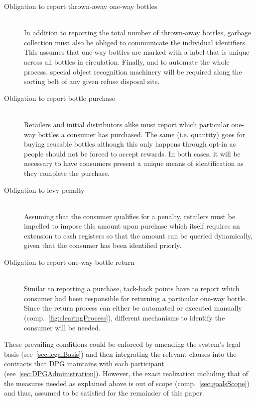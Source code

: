 \begin{description}
	\item[Obligation to report thrown-away one-way bottles]
	\hfill \\
	In addition to reporting the total number of thrown-away bottles\hide{(\ref{itm:reportNumber})}, garbage collection must also be obliged to communicate the individual identifiers\hide{(\ref{itm:reportIdentifier})}. This assumes that one-way bottles are marked with a label that is unique across all bottles in circulation. Finally, and to automate the whole process, special object recognition machinery will be required along the sorting belt of any given refuse disposal site.
	\item[Obligation to report bottle purchase]
	\hfill \\
	Retailers and initial distributors alike must report which particular one-way bottles a consumer has purchased\hide{(\ref{itm:reportOneWays})}. The same (i.e. quantity) goes for buying reusable bottles \hide{(\ref{itm:reportReusableNumber})} although this only happens through opt-in as people should not be forced to accept rewards. In both cases, it will be necessary to have consumers present a unique means of identification as they complete the purchase.
	\item[Obligation to levy penalty]
	\hfill \\
	Assuming that the consumer qualifies for a penalty, retailers must be impelled to impose this amount upon purchase which itself requires an extension to cash registers so that the amount can be queried dynamically\hide{(\ref{itm:lookUpPenalty})}, given that the consumer has been identified priorly.
	\item[Obligation to report one-way bottle return]
	\hfill \\
	Similar to reporting a purchase, tack-back points have to report which consumer had been responsible for returning a particular one-way bottle\hide{(\ref{itm:reportOneWayReturn})}. Since the return process can either be automated or executed manually (comp.~\autoref{fig:clearingProcess}), different mechanisms to identify the consumer will be needed.  
\end{description}

These prevailing conditions could be enforced by amending the system's legal basis (see~\ref{sec:legalBasis}) and then integrating the relevant clauses into the contracts that \ac{DPG} maintains with each participant (see~\ref{sec:DPGAdministration}). However, the exact realization including that of the measures needed as explained above is out of scope (comp.~\ref{sec:goalsScope}) and thus, assumed to be satisfied for the remainder of this paper. 

